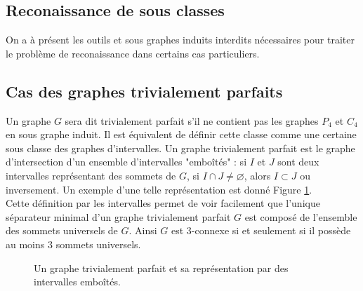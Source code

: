 \documentclass{scrartcl}
\begin{document}
\begin{flushleft}
\section{Reconaissance de sous classes}

On a à présent les outils et sous graphes induits interdits nécessaires pour traiter le problème de reconaissance dans certains cas
particuliers.

\subsection{Cas des graphes trivialement parfaits}

Un graphe $G$ sera dit trivialement parfait s'il ne contient pas les graphes $P_4$ et $C_4$ en sous graphe induit.
Il est équivalent de définir cette classe comme une certaine sous classe des graphes d'intervalles. Un graphe trivialement parfait est le graphe
d'intersection d'un ensemble d'intervalles "emboîtés" : si $I$ et $J$ sont deux intervalles représentant des sommets de $G$,
si $I \cap J \neq \varnothing$, alors $I \subset J$ ou inversement. Un exemple d'une telle représentation est donné Figure
\ref{extrivperf}.\\
Cette définition par les intervalles permet de voir facilement que l'unique séparateur minimal d'un graphe trivialement parfait $G$ est
composé de l'ensemble des sommets universels de $G$. Ainsi $G$ est $3$-connexe si et seulement si il possède au moins $3$ sommets universels.

\begin{figure}[h]
    \caption{Un graphe trivialement parfait et sa représentation par des intervalles emboîtés.}\label{extrivperf}
    \begin{center}
\end{center}
\end{figure}
\end{flushleft}
\end{document}
